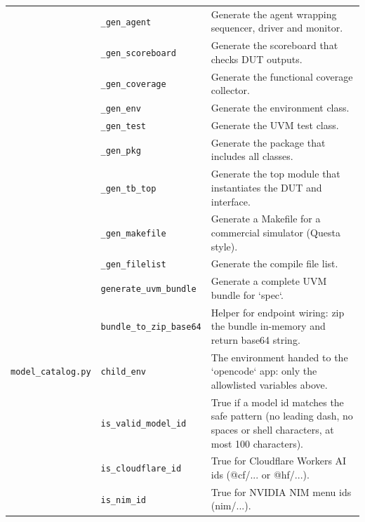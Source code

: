 \begin{longtable}{@{}p{2.8cm}>{\raggedright\arraybackslash}p{4.6cm}p{7.9cm}@{}}
{\small } & \texttt{\small \_\allowbreak{}gen\_\allowbreak{}agent} & Generate the agent wrapping sequencer, driver and monitor. \\
{\small } & \texttt{\small \_\allowbreak{}gen\_\allowbreak{}scoreboard} & Generate the scoreboard that checks DUT outputs. \\
{\small } & \texttt{\small \_\allowbreak{}gen\_\allowbreak{}coverage} & Generate the functional coverage collector. \\
{\small } & \texttt{\small \_\allowbreak{}gen\_\allowbreak{}env} & Generate the environment class. \\
{\small } & \texttt{\small \_\allowbreak{}gen\_\allowbreak{}test} & Generate the UVM test class. \\
{\small } & \texttt{\small \_\allowbreak{}gen\_\allowbreak{}pkg} & Generate the package that includes all classes. \\
{\small } & \texttt{\small \_\allowbreak{}gen\_\allowbreak{}tb\_\allowbreak{}top} & Generate the top module that instantiates the DUT and interface. \\
{\small } & \texttt{\small \_\allowbreak{}gen\_\allowbreak{}makefile} & Generate a Makefile for a commercial simulator (Questa style). \\
{\small } & \texttt{\small \_\allowbreak{}gen\_\allowbreak{}filelist} & Generate the compile file list. \\
{\small } & \texttt{\small generate\_\allowbreak{}uvm\_\allowbreak{}bundle} & Generate a complete UVM bundle for `spec`. \\
{\small } & \texttt{\small bundle\_\allowbreak{}to\_\allowbreak{}zip\_\allowbreak{}base64} & Helper for endpoint wiring: zip the bundle in-memory and return base64 string. \\
{\small \nolinkurl{model_catalog.py}} & \texttt{\small child\_\allowbreak{}env} & The environment handed to the `opencode` app: only the allowlisted variables above. \\
{\small } & \texttt{\small is\_\allowbreak{}valid\_\allowbreak{}model\_\allowbreak{}id} & True if a model id matches the safe pattern (no leading dash, no spaces or shell characters, at most 100 characters). \\
{\small } & \texttt{\small is\_\allowbreak{}cloudflare\_\allowbreak{}id} & True for Cloudflare Workers AI ids (@cf/... or @hf/...). \\
{\small } & \texttt{\small is\_\allowbreak{}nim\_\allowbreak{}id} & True for NVIDIA NIM menu ids (nim/...). \\

\end{longtable}

